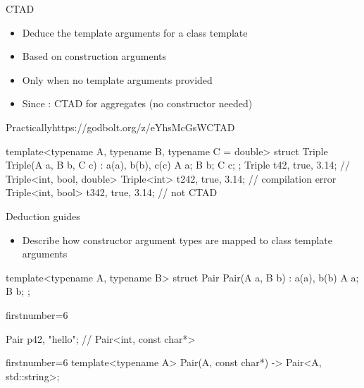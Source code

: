 \begin{advanced}
\begin{frame}[fragile]
  \begin{block}{CTAD}
    \begin{itemize}
    \item Deduce the template arguments for a class template
    \item Based on construction arguments
    \item Only when no template arguments provided
    \item Since : CTAD for aggregates (no constructor needed)
    \end{itemize}
  \end{block}
  \begin{exampleblockGB}{Practically}{https://godbolt.org/z/eYhsMcGsW}{CTAD}
    \small
    \begin{cppcode*}{}
      template<typename A, typename B, typename C = double>
      struct Triple {
        Triple(A a, B b, C c) : a(a), b(b), c(c) {}
        A a; B b; C c;
      };
      Triple t{42, true, 3.14}; // Triple<int, bool, double>
      Triple<int> t2{42, true, 3.14}; // compilation error
      Triple<int, bool> t3{42, true, 3.14}; // not CTAD
    \end{cppcode*}
  \end{exampleblockGB}
\end{frame}

\begin{frame}[fragile]
  \begin{block}{Deduction guides}
    \begin{itemize}
    \item Describe how constructor argument types are mapped to class template arguments
    \end{itemize}
  \end{block}
  \begin{cppcode}
    template<typename A, typename B>
    struct Pair {
     Pair(A a, B b) : a(a), b(b) {}
     A a; B b;
    };
  \end{cppcode}
  \begin{overprint}[\columnwidth]
    \begin{cppcode*}{firstnumber=6}



      Pair p{42, "hello"}; // Pair<int, const char*>
    \end{cppcode*}
    \begin{cppcode*}{firstnumber=6}
      template<typename A>
      Pair(A, const char*) -> Pair<A, std::string>;


\end{cppcode*}
\end{overprint}
\end{frame}
\end{advanced}
